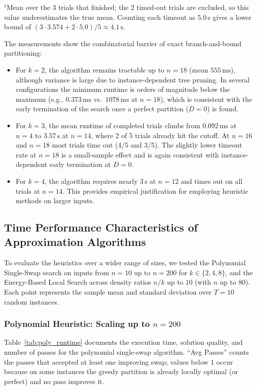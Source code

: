 \documentclass[11pt,a4paper]{article}
\begin{document}
\begin{table}[H]
\vspace{4pt}

\parbox{0.95\linewidth}{\footnotesize $^\dagger$Mean over the 3 trials that finished; the 2 timed-out trials are excluded, so this value underestimates the true mean. Counting each timeout as 5.0\,s gives a lower bound of $(3\cdot 3.574+2\cdot 5.0)/5\approx 4.1\,\text{s}$.}
\end{table}

The measurements show the combinatorial barrier of exact branch-and-bound partitioning:
\begin{itemize}
\item For $k=2$, the algorithm remains tractable up to $n=18$ (mean $555\,\text{ms}$), although variance is large due to instance-dependent tree pruning. In several configurations the minimum runtime is orders of magnitude below the maximum (e.g., $0.373\,\text{ms}$ vs.\ $1078\,\text{ms}$ at $n=18$), which is consistent with the early termination of the search once a perfect partition ($D=0$) is found.
\item For $k=3$, the mean runtime of completed trials climbs from $0.092\,\text{ms}$ at $n=4$ to $3.57\,\text{s}$ at $n=14$, where 2 of 5 trials already hit the cutoff. At $n=16$ and $n=18$ most trials time out (4/5 and 3/5). The slightly lower timeout rate at $n=18$ is a small-sample effect and is again consistent with instance-dependent early termination at $D=0$.
\item For $k=4$, the algorithm requires nearly $3\,\text{s}$ at $n=12$ and times out on all trials at $n=14$. This provides empirical justification for employing heuristic methods on larger inputs.
\end{itemize}

\subsection{Time Performance Characteristics of Approximation Algorithms}
To evaluate the heuristics over a wider range of sizes, we tested the Polynomial Single-Swap search on inputs from $n=10$ up to $n=200$ for $k \in \{2, 4, 8\}$, and the Energy-Based Local Search across density ratios $n/k$ up to $10$ (with $n$ up to $80$). Each point represents the sample mean and standard deviation over $T=10$ random instances.

\subsubsection{Polynomial Heuristic: Scaling up to $n = 200$}
Table~\ref{tab:poly_runtime} documents the execution time, solution quality, and number of passes for the polynomial single-swap algorithm. ``Avg Passes'' counts the passes that accepted at least one improving swap; values below $1$ occur because on some instances the greedy partition is already locally optimal (or perfect) and no pass improves it.
\end{document}
